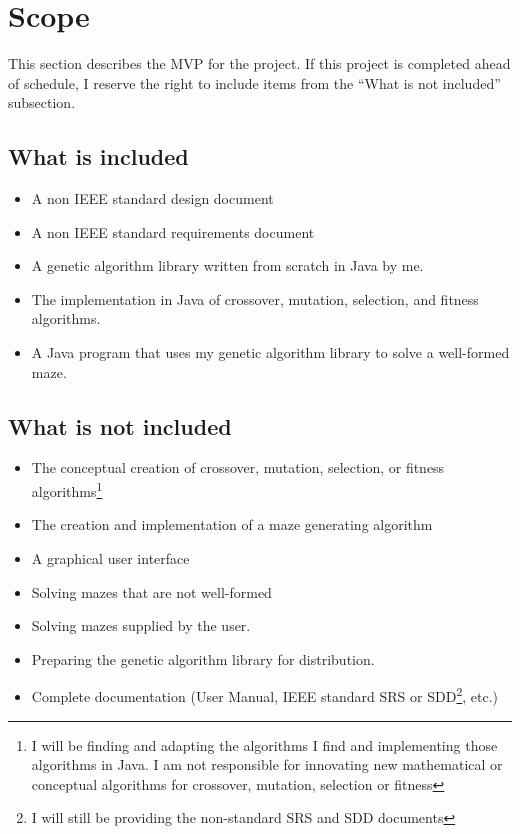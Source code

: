 \documentclass[letterpaper, 12pt]{article}
\begin{document}
\section{Scope}
  This section describes the MVP for the project. If this project is completed ahead of schedule, I reserve the right to include items from the ``What is not included'' subsection.
  \subsection{What is included}
  \begin{itemize}
	 \item A non IEEE standard design document
	 \item A non IEEE standard requirements document
	 \item A genetic algorithm library written from scratch in Java by me.
	 \item The implementation in Java of crossover, mutation, selection, and fitness algorithms.
	 \item A Java program that uses my genetic algorithm library to solve a well-formed maze.
  \end{itemize}
  \subsection{What is not included}
  \begin{itemize}
			 \item The conceptual creation of crossover, mutation, selection, or fitness algorithms\footnote{I will be finding and adapting the algorithms I find and implementing those algorithms in Java. I am not responsible for innovating new mathematical or conceptual algorithms for crossover, mutation, selection or fitness}
	 \item The creation and implementation of a maze generating algorithm
	 \item A graphical user interface
	 \item Solving mazes that are not well-formed
	 \item Solving mazes supplied by the user.
	 \item Preparing the genetic algorithm library for distribution.
	 \item Complete documentation (User Manual, IEEE standard SRS or SDD\footnote{I will still be providing the non-standard SRS and SDD documents}, etc.)
  \end{itemize}
\end{document}
